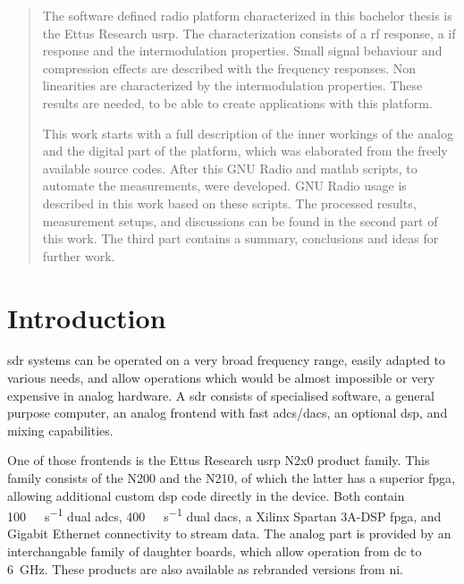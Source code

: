 \documentclass[12pt,a4paper,parskip=full,abstracton]{scrartcl}
\begin{document}
\tableofcontents
\clearpage
\begin{abstract}
The software defined radio platform characterized in this bachelor thesis is the Ettus
Research \gls{usrp}. The characterization consists of a \gls{rf} response,
a \gls{if} response and the intermodulation properties. Small signal
behaviour and compression effects are described with the frequency responses. Non
linearities are characterized by the intermodulation properties. These results
are needed, to be able to create applications with this platform.

This work starts with a full description of the inner workings of the analog and
the digital part of the platform, which was elaborated from the freely available
source codes. After this GNU Radio and matlab scripts, to automate the measurements, were
developed. GNU Radio usage is described in this work based on these scripts. The
processed results, measurement setups, and discussions can be found in
the second part of this work. The third part contains a summary, conclusions and ideas for further work.

\end{abstract}
\clearpage
\section{Introduction}
\Gls{sdr} systems can be operated on a very broad frequency range,
easily adapted to various needs, and allow operations which would be almost
impossible or very expensive in analog hardware. A \gls{sdr} consists of specialised
software, a general purpose computer, an analog frontend with fast
\glspl{adc}/\glspl{dac}, an optional \gls{dsp}, and mixing capabilities.

One of those frontends is 
the Ettus Research \gls{usrp} N2x0 product family. This family consists of the N200 and
the N210, of which the latter has a superior \gls{fpga}, allowing additional custom \gls{dsp} code directly
in the device. Both contain \SI{100}{\mega\samples\per\second} dual \glspl{adc},
\SI{400}{\mega\samples\per\second} dual \glspl{dac}, a Xilinx Spartan
3A-DSP \gls{fpga}, and Gigabit Ethernet connectivity to stream data. The analog part is
provided by an interchangable family of daughter boards, which allow operation from
\gls{dc} to \SI{6}{\giga\hertz}\cite{ettus_n2x0}. These products are also available as rebranded
versions from \gls{ni}.
\end{document}
